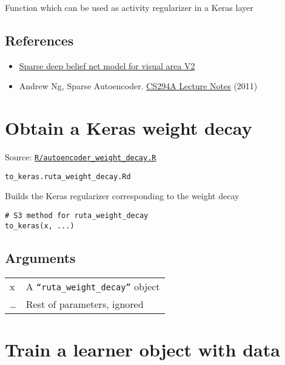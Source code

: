 Function which can be used as activity regularizer in a Keras layer

\hypertarget{references}{\subsection{\texorpdfstring{\protect\hyperlink{references}{}References}{References}}\label{references}}

\begin{itemize}
\item
  \href{http://papers.nips.cc/paper/3313-sparse-deep-belief-net-model-for-visual-area-v2}{Sparse
  deep belief net model for visual area V2}
\item
  Andrew Ng, Sparse Autoencoder.
  \href{https://web.stanford.edu/class/cs294a/sparseAutoencoder_2011new.pdf}{CS294A
  Lecture Notes} (2011)
\end{itemize}

\section{Obtain a Keras weight decay}\label{obtain-a-keras-weight-decay}

Source:
\href{https://github.com/fdavidcl/ruta/blob/master/R/autoencoder_weight_decay.R}{\texttt{R/autoencoder\_weight\_decay.R}}

\texttt{to\_keras.ruta\_weight\_decay.Rd}

Builds the Keras regularizer corresponding to the weight decay

\begin{verbatim}
# S3 method for ruta_weight_decay
to_keras(x, ...)
\end{verbatim}

\hypertarget{arguments}{\subsection{\texorpdfstring{\protect\hyperlink{arguments}{}Arguments}{Arguments}}\label{arguments}}

\begin{longtable}[c]{@{}>{\small}p{3cm}>{\raggedright}p{12.5cm}@{}}
\toprule
x & A \texttt{``ruta\_weight\_decay''} object\tabularnewline
\ldots{} & Rest of parameters, ignored\tabularnewline
\bottomrule
\end{longtable}

\section{Train a learner object with
data}\label{train-a-learner-object-with-data}

